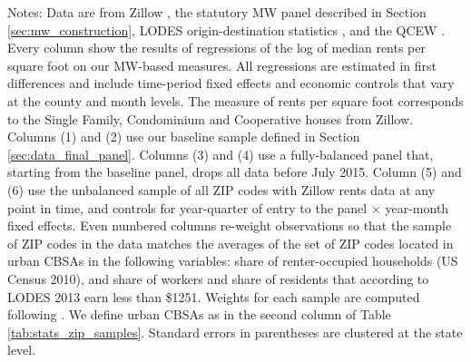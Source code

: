 \begin{landscape}
\begin{table}[hbt!]
    \begin{minipage}{.95\linewidth} \footnotesize
        \vspace{2mm}
        Notes:
        Data are from Zillow \parencite{ZillowData}, 
        the statutory MW panel described in Section \ref{sec:mw_construction}, 
        LODES origin-destination statistics \parencite{CensusLODES},
        and the QCEW \parencite{QCEW}.
        Every column show the results of regressions of the log of 
        median rents per square foot on our MW-based measures.
        All regressions are estimated in first differences and include 
        time-period fixed effects and economic controls that vary at the 
        county and month levels.
        The measure of rents per square foot corresponds to the Single Family, 
        Condominium and Cooperative houses from Zillow.
        Columns (1) and (2) use our baseline sample defined in Section 
        \ref{sec:data_final_panel}.
        Columns (3) and (4) use a fully-balanced panel that, starting from the 
        baseline panel, drops all data before July 2015.
        Column (5) and (6) use the unbalanced sample of all ZIP codes with 
        Zillow rents data at any point in time, and controls for year-quarter of 
        entry to the panel $\times$ year-month fixed effects.
        Even numbered columns re-weight observations so that the sample of 
        ZIP codes in the data matches the averages of the set of ZIP codes
        located in urban CBSAs in the following variables:
        share of renter-occupied households (US Census 2010), and share of 
        workers and share of residents that according to LODES 2013 earn less than \$1251.
        Weights for each sample are computed following \textcite{Hainmueller2012}.
        We define urban CBSAs as in the second column of Table 
        \ref{tab:stats_zip_samples}.
        Standard errors in parentheses are clustered at the state level.
    \end{minipage}
\end{table}
\end{landscape}
